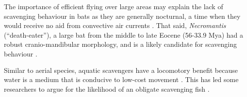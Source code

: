 \documentclass[a4paper,12pt]{article}
\begin{document}
The importance of efficient flying over large areas may explain the lack of scavenging behaviour in bats as they are generally nocturnal, a time when they would receive no aid from convective air currents \citep{norberg2012vertebrate}. 
That said, \textit{Necromantis} (``death-eater''), a large bat from the middle to late Eocene (56-33.9 Mya) had a robust cranio-mandibular morphology, and is a likely candidate for scavenging behaviour \citep{Weithofer_Necromantis_1887,Hand_Necromantis_2012}.%

Similar to aerial species, aquatic scavengers have a locomotory benefit because water is a medium that is conducive to low-cost movement \citep{tucker1975energetic,williams1999evolution}.
This has led some researchers to argue for the likelihood of an obligate scavenging fish \citep{ruxton2004energetic,ruxton2005searching}. 
\end{document}
